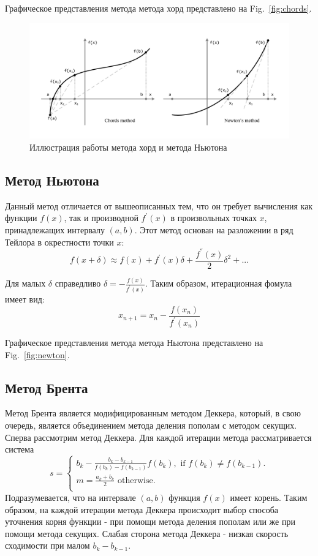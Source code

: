 \documentclass[
11pt,%
tightenlines,%
twoside,%
onecolumn,%
nofloats,%
nobibnotes,%
nofootinbib,%
superscriptaddress,%
noshowpacs,%
centertags]%
{revtex4}
\begin{document}
Графическое представления метода метода хорд представлено на Fig.~\ref{fig:chords}.

\begin{figure}[h]
\setcaptionmargin{5mm}
\onelinecaptionstrue
\includegraphics[width=1.0\textwidth]{pics/chords-newton.pdf}
\caption{Иллюстрация работы метода хорд и метода Ньютона}\label{fig:chords-newton}
\end{figure}

\subsection{Метод Ньютона}
Данный метод отличается от вышеописанных тем, что он требует вычисления как функции $f(x)$, так и производной $f^{'}(x)$ в произвольных точках $x$, принадлежащих интервалу $(a, b)$. Этот метод основан на разложении в ряд Тейлора в окрестности точки $x$:
\begin{equation}
f(x+\delta) \approx f(x)+f^{'}(x)\delta+\frac{f^{''}(x)}{2}\delta^2+ ...
\end{equation}

Для малых $\delta$ справедливо $\delta=-\frac{f(x)}{f^{'}(x)}$.
Таким образом, итерационная фомула имеет вид:
\begin{equation}
x_{n+1}=x_n-\frac{f(x_n)}{f^{'}(x_n)}
\end{equation}

Графическое представления метода метода Ньютона представлено на Fig.~\ref{fig:newton}.
\newpage

\subsection{Метод Брента}
Метод Брента является модифицированным методом Деккера, который, в свою очередь, является объединением метода деления пополам с методом секущих.
Сперва рассмотрим метод Деккера. Для каждой итерации метода рассматривается система
\begin{equation}
s=\begin{cases}
b_k - \frac{b_k-b_{k-1}}{f(b_k)-f(b_{k-1})}f(b_k), \text{ if $f(b_k) \neq f(b_{k-1})$}.\\
m = \frac{a_k+b_k}{2} \text{ otherwise}.\\
\end{cases}
\end{equation}
Подразумевается, что на интервале $(a,b)$ функция $f(x)$ имеет корень. Таким образом, на каждой итерации метода Деккера происходит выбор способа уточнения корня функции - при помощи метода деления пополам или же при помощи метода секущих. Слабая сторона метода Деккера - низкая скорость сходимости при малом $b_k-b_{k-1}$. 
\end{document}
